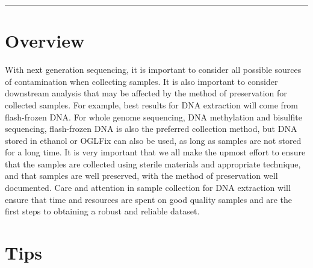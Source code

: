 \documentclass[
  letterpaper,
  DIV=11,
  numbers=noendperiod]{scrreprt}
\begin{document}
\begin{center}\rule{0.5\linewidth}{0.5pt}\end{center}

\hypertarget{overview-2}{%
\section*{\texorpdfstring{\textbf{Overview}}{Overview}}\label{overview-2}}

With next generation sequencing, it is important to consider all
possible sources of contamination when collecting samples. It is also
important to consider downstream analysis that may be affected by the
method of preservation for collected samples. For example, best results
for DNA extraction will come from flash-frozen DNA. For whole genome
sequencing, DNA methylation and bisulfite sequencing, flash-frozen DNA
is also the preferred collection method, but DNA stored in ethanol or
OGLFix can also be used, as long as samples are not stored for a long
time. It is very important that we all make the upmost effort to ensure
that the samples are collected using sterile materials and appropriate
technique, and that samples are well preserved, with the method of
preservation well documented. Care and attention in sample collection
for DNA extraction will ensure that time and resources are spent on good
quality samples and are the first steps to obtaining a robust and
reliable dataset.

\hypertarget{tips}{%
\section*{\texorpdfstring{\textbf{Tips}}{Tips}}\label{tips}}
\end{document}
